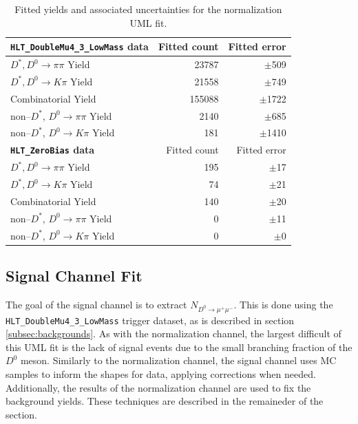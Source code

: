 \begin{table}[h!]
    \centering
    \begin{tabular}{@{}lrr@{}}
    \toprule
    \toprule
    \textbf{\texttt{HLT\_DoubleMu4\_3\_LowMass} data}& Fitted count & Fitted error  \\
    \midrule
    $D^*, D^0 \to \pi\pi$ Yield        & 23787 & $\pm$509 \\
    $D^*, D^0 \to K\pi$ Yield          & 21558  & $\pm$749 \\
    Combinatorial Yield               & 155088 & $\pm$1722 \\
    non--$D^*$, $D^0 \to \pi\pi$ Yield & 2140   & $\pm$685 \\
    non--$D^*$, $D^0 \to K\pi$ Yield   & 181     & $\pm$1410 \\
    \bottomrule
    \toprule
    \textbf{\texttt{HLT\_ZeroBias} data} & Fitted count & Fitted error \\
    \midrule
    $D^*, D^0 \to \pi\pi$ Yield        & 195 & $\pm$17 \\
    $D^*, D^0 \to K\pi$ Yield          & 74  & $\pm$21 \\
    Combinatorial Yield               & 140 & $\pm$20 \\
    non--$D^*$, $D^0 \to \pi\pi$ Yield & 0   & $\pm$11 \\
    non--$D^*$, $D^0 \to K\pi$ Yield   & 0     & $\pm$0 \\
    \bottomrule
    \bottomrule
    \end{tabular}
    \caption{Fitted yields and associated uncertainties for the normalization UML fit.}
    \label{tab:d0pipi_uml_fit_results}
    \end{table}

\subsection{Signal Channel Fit}
\label{subsec:signal_channel_uml}

The goal of the signal channel is to extract $N_{D^0 \to \mu^+ \mu^-}$. This is done using the \texttt{HLT\_DoubleMu4\_3\_LowMass} trigger dataset, as is described in section \ref{subsec:backgrounds}. As with the normalization channel, the largest difficult of this UML fit is the lack of signal events due to the small branching fraction of the $D^0$ meson. Similarly to the normalization channel, the signal channel uses MC samples to inform the shapes for data, applying corrections when needed. Additionally, the results of the normalization channel are used to fix the background yields. These techniques are described in the remaineder of the section.

